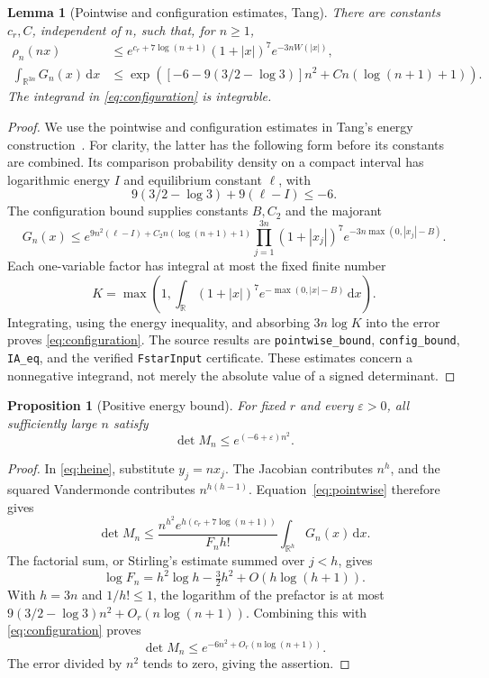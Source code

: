 \documentclass[11pt]{article}
\newtheorem{lemma}[theorem]{Lemma}
\newtheorem{proposition}[theorem]{Proposition}
\numberwithin{equation}{section}
\newcommand{\R}{\mathbb R}
\newcommand{\dd}{\,\mathrm d}
\begin{document}
\begin{lemma}[Pointwise and configuration estimates, Tang]
\label{lem:configuration}
There are constants $c_r,C$, independent of $n$, such that, for $n\geq1$,
\begin{align}
 \rho_n(nx)&\leq e^{c_r+7\log(n+1)}
                    (1+|x|)^7e^{-3nW(|x|)},\label{eq:pointwise}\\
 \int_{\R^{3n}}G_n(x)\dd x
   &\leq\exp\!\left(
       [-6-9(3/2-\log3)]n^2+Cn(\log(n+1)+1)\right).
       \label{eq:configuration}
\end{align}
The integrand in \eqref{eq:configuration} is integrable.
\end{lemma}
\begin{proof}
We use the pointwise and configuration estimates in Tang's energy
construction~\cite{Tang}. For clarity, the latter has the following
form before its constants are combined. Its comparison probability
density on a compact interval has logarithmic energy $I$ and equilibrium
constant $\ell$, with
\[
                  9(3/2-\log3)+9(\ell-I)\leq-6.
\]
The configuration bound supplies constants $B,C_2$ and the majorant
\[
 G_n(x)\leq
 e^{9n^2(\ell-I)+C_2n(\log(n+1)+1)}
 \prod_{j=1}^{3n}(1+|x_j|)^7e^{-3n\max(0,|x_j|-B)}.
\]
Each one-variable factor has integral at most the fixed finite number
\[
 K=\max\left(1,\int_\R(1+|x|)^7e^{-\max(0,|x|-B)}\dd x\right).
\]
Integrating, using the energy inequality, and absorbing
$3n\log K$ into the error proves \eqref{eq:configuration}.
The source results are \texttt{pointwise\_bound},
\texttt{config\_bound}, \texttt{IA\_eq}, and the verified
\texttt{FstarInput} certificate. These estimates concern a nonnegative
integrand, not merely the absolute value of a signed determinant.
\end{proof}

\begin{proposition}[Positive energy bound]\label{prop:energy}
For fixed $r$ and every $\varepsilon>0$, all sufficiently large $n$ satisfy
\[
                         \det M_n\leq e^{(-6+\varepsilon)n^2}.
\]
\end{proposition}
\begin{proof}
In \eqref{eq:heine}, substitute $y_j=nx_j$.
The Jacobian contributes $n^h$, and the squared Vandermonde contributes
$n^{h(h-1)}$. Equation~\eqref{eq:pointwise} therefore gives
\[
 \det M_n\leq
 \frac{n^{h^2}e^{h(c_r+7\log(n+1))}}{F_nh!}
                        \int_{\R^h}G_n(x)\dd x.
\]
The factorial sum, or Stirling's estimate summed over $j<h$, gives
\[
 \log F_n=h^2\log h-\tfrac32h^2+O(h\log(h+1)).
\]
With $h=3n$ and $1/h!\leq1$, the logarithm of the prefactor is at most
$9(3/2-\log3)n^2+O_r(n\log(n+1))$.
Combining this with \eqref{eq:configuration} proves
\[
                 \det M_n\leq e^{-6n^2+O_r(n\log(n+1))}.
\]
The error divided by $n^2$ tends to zero, giving the assertion.
\end{proof}
\end{document}
